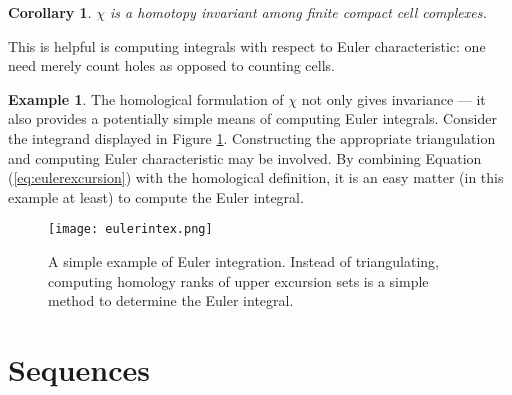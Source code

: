 \documentclass{psapm-l}
\newtheorem{corollary}[theorem]{Corollary}
\theoremstyle{definition}
\newtheorem{example}[theorem]{Example}
\theoremstyle{remark}
\numberwithin{equation}{section}
\begin{document}
\begin{corollary}
\label{cor:Eulerinvt}
$\chi$ is a homotopy invariant among finite compact cell complexes.
\end{corollary}

This is helpful is computing integrals with respect to Euler characteristic: one need merely count holes as opposed to counting cells.

\begin{example}
The homological formulation of $\chi$ not only gives invariance --- it also provides a potentially simple means of computing Euler integrals. Consider the integrand displayed in Figure \ref{fig:eulerintex}. Constructing the appropriate triangulation and computing Euler characteristic may be involved. By combining Equation (\ref{eq:eulerexcursion}) with the homological definition, it is an easy matter (in this example at least) to compute the Euler integral.
\begin{figure}[hbt]
\begin{center}
\texttt{[image: eulerintex.png]}
\caption{A simple example of Euler integration. Instead of triangulating, computing homology ranks of upper excursion sets is a simple method to determine the Euler integral.}
\label{fig:eulerintex}
\end{center}
\end{figure}
\end{example}

\section{Sequences}
\label{sec:seq}
\end{document}
